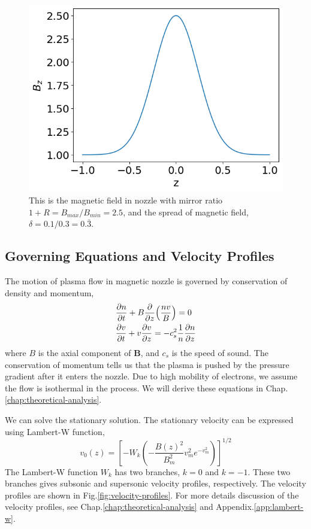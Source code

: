 \begin{figure}[htbp]
	\centering
	\includegraphics[width=0.7\linewidth]{img/magnetic-field}
	\caption{This is the magnetic field in nozzle with mirror ratio $1+R=B_{max}/B_{min}=2.5$, and the spread of magnetic field, $\delta=0.1/0.3=0.\bar{3}$. }
	\label{fig:magnetic-field}
\end{figure}

\subsection{Governing Equations and Velocity Profiles}
The motion of plasma flow in magnetic nozzle is governed by conservation of density and momentum,
\begin{align}
	 & \pdv{n}{t} + B\pdv{z}(\frac{nv}{B}) = 0                \\
	 & \pdv{v}{t} + v\pdv{v}{z} = -c_s^2\frac{1}{n}\pdv{n}{z}
\end{align}
where $B$ is the axial component of $\mathbf{B}$, and $c_s$ is the speed of sound. The conservation of momentum tells us that the plasma is pushed by the pressure gradient after it enters the nozzle. Due to high mobility of electrons, we assume the flow is isothermal in the process. We will derive these equations in Chap.\ref{chap:theoretical-analysis}.

We can solve the stationary solution. The stationary velocity can be expressed using Lambert-W function,
\[ v_0(z) = \left[ -W_k\left(-\frac{B(z)^2}{B_m^2}v_m^2e^{-v_m^2}\right) \right]^{1/2} \]
The Lambert-W function $W_k$ has two branches, $k=0$ and $k=-1$. These two branches gives subsonic and supersonic velocity profiles, respectively. The velocity profiles are shown in Fig.\ref{fig:velocity-profiles}. For more details discussion of the velocity profiles, see Chap.\ref{chap:theoretical-analysis} and Appendix.\ref{app:lambert-w}.

